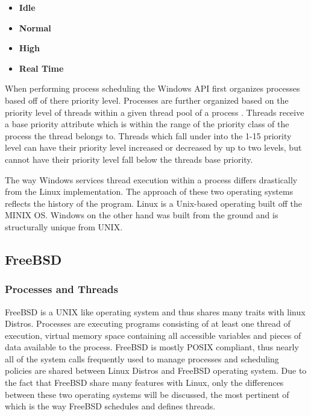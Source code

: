         \begin{center}
        \begin{itemize}
                \item \textbf{Idle}
                \item \textbf{Normal}
                \item \textbf{High}
                \item \textbf{Real Time}
        \end{itemize}
        \end{center}

        \normalfont \indent When performing process scheduling the Windows API first organizes processes based off of there priority level. Processes are further organized based on the priority level of threads within a given thread pool of a process \cite{windowsInternals}. Threads receive a base priority attribute which is within the range of the priority class of the process the thread belongs to. Threads which fall under into the 1-15 priority level can have their priority level increased or decreased by up to two levels, but cannot have their priority level fall below the threads base priority.

	\normalfont \indent The way Windows services thread execution within a process differs drastically from the Linux implementation. The approach of these two operating systems reflects the history of the program. Linux is a Unix-based operating built off the MINIX OS. Windows on the other hand was built from the ground and is structurally unique from UNIX.

\subsection{\bf FreeBSD}
   
  \subsubsection{\bf Processes and Threads}
    \normalfont \indent FreeBSD is a UNIX like operating system and thus shares many traits with linux Distros. Processes are executing programs consisting of at least one thread of execution, virtual memory space containing all accessible variables and pieces of data available to the process. FreeBSD is mostly POSIX compliant, thus nearly all of the system calls frequently used to manage processes and scheduling policies are shared between Linux Distros and FreeBSD operating system. Due to the fact that FreeBSD share many features with Linux, only the differences between these two operating systems will be discussed, the most pertinent of which is the way FreeBSD schedules and defines threads.


